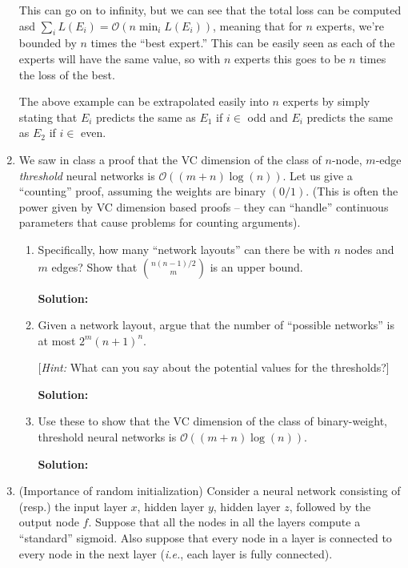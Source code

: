 \documentclass[12pt]{article}
\newcommand{\BigO}[1]{\mathcal{O}\left( #1 \right)}
\begin{document}
\begin{enumerate}
This can go on to infinity, but we can see that the total loss can be computed asd $\sum_{i}L(E_{i}) = \BigO{n \min_{i}L(E_{i})}$, meaning that for $n$ experts, we're bounded by $n$ times the ``best expert.'' This can be easily seen as each of the experts will have the same value, so with $n$ experts this goes to be $n$ times the loss of the best.

The above example can be extrapolated easily into $n$ experts by simply stating that $E_{i}$ predicts the same as $E_{1}$ if $i \in $ odd and $E_{i}$ predicts the same as $E_{2}$ if $i \in $ even.

\item We saw in class a proof that the VC dimension of the class of $n$-node, $m$-edge {\em threshold} neural networks is $\BigO{(m+n)\log(n)}$. Let us give a ``counting'' proof, assuming the weights are binary $(0/1)$. (This is often the power given by VC dimension based proofs -- they can ``handle'' continuous parameters that cause problems for counting arguments).

\begin{enumerate}
  \item Specifically, how many ``network layouts'' can there be with $n$ nodes and $m$ edges? Show that ${n(n-1)/2}\choose{m}$ is an upper bound.

   {\bf Solution:}

   \item Given a network layout, argue that the number of ``possible networks'' is at most $2^{m}(n+1)^{n}$. 

[{\em Hint:} What can you say about the potential values for the thresholds?]

   {\bf Solution:}

\item Use these to show that the VC dimension of the class of binary-weight, threshold neural networks is $\BigO{(m+n)\log(n)}$.

   {\bf Solution:}

\end{enumerate}

\item (Importance of random initialization) Consider a neural network consisting of (resp.) the input layer $x$, hidden layer $y$, hidden layer $z$, followed by the output node $f$. Suppose that all the nodes in all the layers compute a ``standard'' sigmoid. Also suppose that every node in a layer is connected to every node in the next layer ({\em i.e.}, each layer is fully connected).


\end{enumerate}
\end{document}
